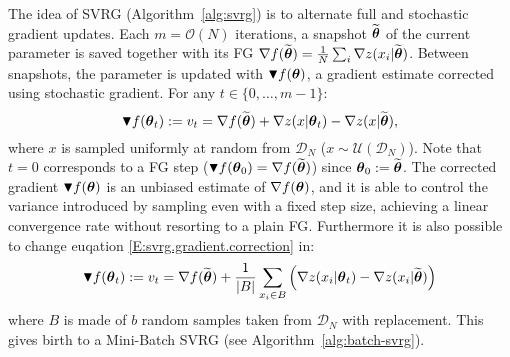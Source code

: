 The idea of \acs{SVRG} (Algorithm~\ref{alg:svrg}) is to alternate full and stochastic gradient updates. 
Each $m = \mathcal{O}(N)$ iterations, a snapshot $\widetilde{\boldsymbol{\theta}}$ of the current parameter is saved together with its \acs{FG} $\nabla f(\widetilde{\boldsymbol{\theta}}) = \frac{1}{N} \sum_i \nabla z(x_i|\widetilde{\boldsymbol{\theta}})$.
Between snapshots, the parameter is updated with $\blacktriangledown f(\boldsymbol{\theta})$, a gradient estimate corrected using stochastic gradient. For any $t \in \{0,\ldots,m-1\}$:
\begin{equation}\label{E:svrg.gradient.correction}
        \blacktriangledown f(\boldsymbol{\theta}_{t}) := v_t = \nabla f(\widetilde{\boldsymbol{\theta}}) + \nabla z(x | \boldsymbol{\theta}_t) - \nabla z(x | \widetilde{\boldsymbol{\theta}}),
\end{equation} 
where $x$ is sampled uniformly at random from $\mathcal{D}_N$ (\ie $x \sim \mathcal{U}(\mathcal{D}_N)$).
Note that $t=0$ corresponds to a \acs{FG} step (\ie $\blacktriangledown f(\boldsymbol{\theta}_0) = \nabla f(\widetilde{\boldsymbol{\theta}})$) since $\boldsymbol{\theta}_0 := \widetilde{\boldsymbol{\theta}}$.
The corrected gradient $\blacktriangledown f(\boldsymbol{\theta})$ is an unbiased estimate of $\nabla f(\boldsymbol{\theta})$, and it is able to control the variance introduced by sampling even with a fixed step size, achieving a linear convergence rate without resorting to a plain \acs{FG}. Furthermore it is also possible to change euqation \ref{E:svrg.gradient.correction} in:
\begin{equation}\label{E:batch.svrg.gradient.correction}
\blacktriangledown f(\boldsymbol{\theta}_{t}) := v_t = \nabla f(\widetilde{\boldsymbol{\theta}}) + \frac{1}{\left|B\right|}\sum_{x_i\in B} \left(\nabla z(x_i | \boldsymbol{\theta}_t) - \nabla z(x_i | \widetilde{\boldsymbol{\theta}})\right)
\end{equation}
where $B$ is made of $b$ random samples taken from $\mathcal{D}_N$ with replacement. This gives birth to a Mini-Batch \acs{SVRG} \citep{reddi2016stochastic} (see Algorithm~\ref{alg:batch-svrg}).

